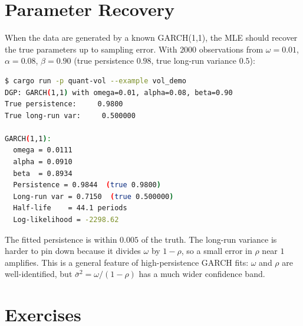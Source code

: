 \section{Parameter Recovery}

When the data are generated by a known GARCH(1,1), the MLE should recover the
true parameters up to sampling error. With $2000$ observations from
$\omega = 0.01$, $\alpha = 0.08$, $\beta = 0.90$ (true persistence $0.98$,
true long-run variance $0.5$):

\begin{lstlisting}[language=bash]
$ cargo run -p quant-vol --example vol_demo
DGP: GARCH(1,1) with omega=0.01, alpha=0.08, beta=0.90
True persistence:     0.9800
True long-run var:     0.500000

GARCH(1,1):
  omega = 0.0111
  alpha = 0.0910
  beta  = 0.8934
  Persistence = 0.9844  (true 0.9800)
  Long-run var = 0.7150  (true 0.500000)
  Half-life    = 44.1 periods
  Log-likelihood = -2298.62
\end{lstlisting}

The fitted persistence is within $0.005$ of the truth. The long-run variance
is harder to pin down because it divides $\omega$ by $1 - \rho$, so a small
error in $\rho$ near $1$ amplifies. This is a general feature of
high-persistence GARCH fits: $\omega$ and $\rho$ are well-identified, but
$\bar\sigma^2 = \omega / (1 - \rho)$ has a much wider confidence band.

\section{Exercises}

